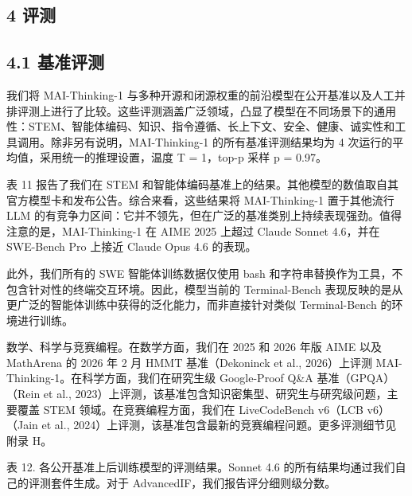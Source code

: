 \subsection{4 评测}\label{evaluations}

\subsection{4.1 基准评测}\label{benchmark-evaluations}

我们将 MAI-Thinking-1 与多种开源和闭源权重的前沿模型在公开基准以及人工并排评测上进行了比较。这些评测涵盖广泛领域，凸显了模型在不同场景下的通用性：STEM、智能体编码、知识、指令遵循、长上下文、安全、健康、诚实性和工具调用。除非另有说明，MAI-Thinking-1 的所有基准评测结果均为 4 次运行的平均值，采用统一的推理设置，温度 T = 1，top-p 采样 p = 0.97。

表 11 报告了我们在 STEM 和智能体编码基准上的结果。其他模型的数值取自其官方模型卡和发布公告。综合来看，这些结果将 MAI-Thinking-1 置于其他流行 LLM 的有竞争力区间：它并不领先，但在广泛的基准类别上持续表现强劲。值得注意的是，MAI-Thinking-1 在 AIME 2025 上超过 Claude Sonnet 4.6，并在 SWE-Bench Pro 上接近 Claude Opus 4.6 的表现。

此外，我们所有的 SWE 智能体训练数据仅使用 bash 和字符串替换作为工具，不包含针对性的终端交互环境。因此，模型当前的 Terminal-Bench 表现反映的是从更广泛的智能体训练中获得的泛化能力，而非直接针对类似 Terminal-Bench 的环境进行训练。

数学、科学与竞赛编程。在数学方面，我们在 2025 和 2026 年版 AIME 以及 MathArena 的 2026 年 2 月 HMMT 基准（Dekoninck et al., 2026）上评测 MAI-Thinking-1。在科学方面，我们在研究生级 Google-Proof Q\&A 基准（GPQA）（Rein et al., 2023）上评测，该基准包含知识密集型、研究生与研究级问题，主要覆盖 STEM 领域。在竞赛编程方面，我们在 LiveCodeBench v6（LCB v6）（Jain et al., 2024）上评测，该基准包含最新的竞赛编程问题。更多评测细节见附录 H。

表 12. 各公开基准上后训练模型的评测结果。Sonnet 4.6 的所有结果均通过我们自己的评测套件生成。对于 AdvancedIF，我们报告评分细则级分数。

